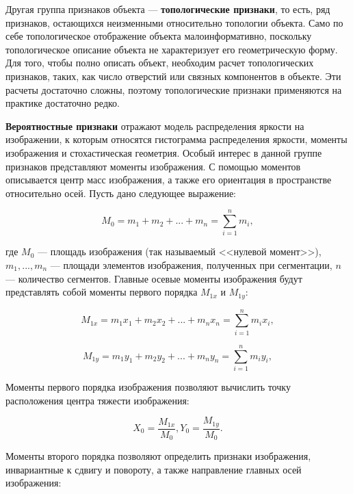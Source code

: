Другая группа признаков объекта --- \textbf{топологические признаки}, то есть, ряд признаков, остающихся неизменными относительно топологии объекта. Само по себе топологическое отображение объекта малоинформативно, поскольку топологическое описание объекта не характеризует его геометрическую форму. Для того, чтобы полно описать объект, необходим расчет топологических признаков, таких, как число отверстий или связных компонентов в объекте. Эти расчеты достаточно сложны, поэтому топологические признаки применяются на практике достаточно редко.

\textbf{Вероятностные признаки} отражают модель распределения яркости на изображении, к которым относятся гистограмма распределения яркости, моменты изображения и стохастическая геометрия. Особый интерес в данной группе признаков представляют моменты изображения. С помощью моментов описывается центр масс изображения, а также его ориентация в пространстве относительно осей. Пусть дано следующее выражение:

\begin{equation}
M_0 = m_1 + m_2 + ... + m_n = \sum_{i=1}^{n} m_i,
\label{eq_3_5}
\end{equation}

где $M_0$ --- площадь изображения (так называемый <<нулевой момент>>), $m_1, ..., m_n$ --- площади элементов изображения, полученных при сегментации, $n$ --- количество сегментов. Главные осевые моменты изображения будут представлять собой моменты первого порядка $M_{1x}$ и $M_{1y}$:

\begin{equation}
M_{1x} = m_1 x_1 + m_2 x_2 + ... + m_n x_n = \sum_{i=1}^{n} m_i x_i,
\label{eq_3_6}
\end{equation}

\begin{equation}
M_{1y} = m_1 y_1 + m_2 y_2 + ... + m_n y_n = \sum_{i=1}^{n} m_i y_i,
\label{eq_3_7}
\end{equation}

Моменты первого порядка изображения позволяют вычислить точку расположения центра тяжести изображения:

\begin{equation}
X_0 = \frac{M_{1x}}{M_0}, Y_0 = \frac{M_{1y}}{M_0}.
\label{eq_3_8}
\end{equation}

Моменты второго порядка позволяют определить признаки изображения, инвариантные к сдвигу и повороту, а также направление главных осей изображения:

